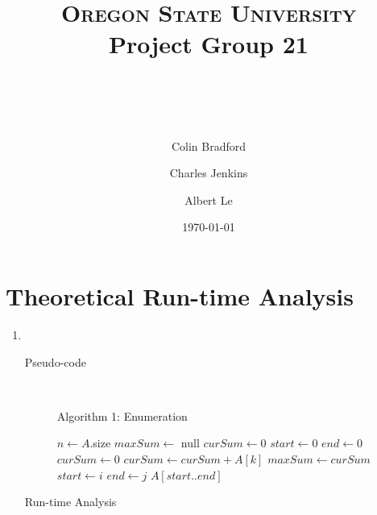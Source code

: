 \documentclass[paper=a4, fontsize=11pt]{scrartcl} %
\title{ 
    \normalfont \normalsize 
    \textsc{Oregon State University} \\ [25pt]
    \large Project Group 21
    \horrule{0.5pt} \\[0.4cm] %
    \huge \hwtitle \\ %
    \horrule{2pt} \\[0.5cm] %
}
\author{
    Colin Bradford
    \and
    Charles Jenkins
    \and
    Albert Le
} %
\date{\normalsize\today} %
\numberwithin{equation}{section} %
\numberwithin{figure}{section} %
\numberwithin{table}{section} %
\begin{document}
\maketitle %


\section{Theoretical Run-time Analysis}
\begin{enumerate}[label=\bfseries Algorithm \arabic*:]
    \item \hfill \\
    \begin{description}
        \item[Pseudo-code] \hfill \\
        \begin{algorithmc}
            \caption{Algorithm 1: Enumeration}
                \State $n \gets A$.size
                \State $maxSum \gets$ null
                \State $curSum \gets 0$
                \State $start \gets 0$
                \State $end \gets 0$
                        \State $curSum \gets 0$
                            \State $curSum \gets curSum + A[k]$
                        \EndFor
                            \State $maxSum \gets curSum$
                            \State $start \gets i$
                            \State $end \gets j$
                        \EndIf
                    \EndFor
                \EndFor
                \State \Return $A[start..end]$
            \EndFunction
        \end{algorithmc}
        \item[Run-time Analysis] \hfill \\
    \end{description}


\end{enumerate}
\end{document}

